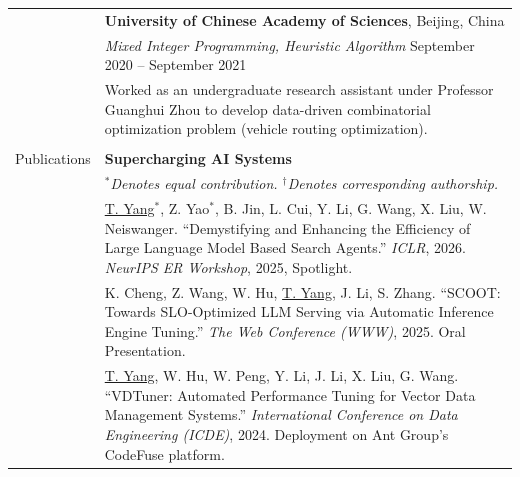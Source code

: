 \documentclass[letterpaper, 10pt]{article}
\begin{document}
\begin{longtable}{p{}p{}}
& \textbf{University of Chinese Academy of Sciences}, Beijing, China \\ 
& \textit{Mixed Integer Programming, Heuristic Algorithm} \hfill September 2020 -- September 2021 \\
&  Worked as an undergraduate research assistant under Professor Guanghui Zhou to develop data-driven combinatorial optimization problem (vehicle routing optimization). \\
& \\




\nohyphens{\textcolor{OliveGreen}{Publications}} 
& \textbf{Supercharging AI Systems} 
\vspace{0.01\textwidth} \\

& \textit{$^*$Denotes equal contribution. $^\dagger$Denotes corresponding authorship.} 
\vspace{0.01\textwidth} \\

& \underline{T. Yang}$^*$, Z. Yao$^*$, B. Jin, L. Cui, Y. Li, G. Wang, X. Liu, W. Neiswanger. \enquote{Demystifying and Enhancing the Efficiency of Large Language Model Based Search Agents.} \textit{ICLR}, 2026. \textit{NeurIPS ER Workshop}, 2025, \textcolor[RGB]{200, 0, 0}{Spotlight.}
\vspace{0.01\textwidth} \\

& K. Cheng, Z. Wang, W. Hu, \underline{T. Yang}, J. Li, S. Zhang. \enquote{SCOOT: Towards SLO-Optimized LLM Serving via Automatic Inference Engine Tuning.} \textit{The Web Conference (WWW)}, 2025. \textcolor[RGB]{200, 0, 0}{Oral Presentation.}
\vspace{0.01\textwidth} \\

& \underline{T. Yang}, W. Hu, W. Peng, Y. Li, J. Li, X. Liu, G. Wang. \enquote{VDTuner: Automated Performance Tuning for Vector Data Management Systems.} \textit{International Conference on Data Engineering (ICDE)}, 2024. \textcolor[RGB]{200, 0, 0}{Deployment on Ant Group's CodeFuse platform.}
\vspace{0.01\textwidth} \\


\end{longtable}
\end{document}
